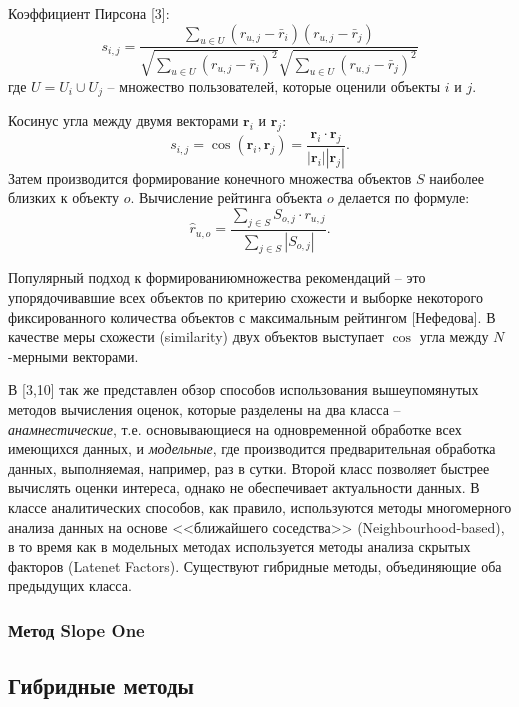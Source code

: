 \documentclass[a4paper,14pt,openany,final]{extreport} %
\begin{document}
Коэффициент Пирсона [3]:
\[
  s_{i,j}=\frac{\sum\limits_{u\in U}(r_{u,j}-\bar{r}_i)(r_{u,j}-\bar{r}_j)}{\sqrt{\sum\limits_{u\in U}(r_{u,j}-\bar{r}_i)^2}\sqrt{\sum\limits_{u\in U}(r_{u,j}-\bar{r}_j)^2}}
\]
где $U=U_i\cup U_j$ -- множество пользователей, которые оценили объекты $i$ и $j$.

Косинус угла между двумя векторами $\mathbf{r}_i$ и $\mathbf{r}_j$:
\[
  s_{i,j}=\cos(\mathbf{r}_i,\mathbf{r}_j)=\frac{\mathbf{r}_i \cdot \mathbf{r}_j}{|\mathbf{r}_i||\mathbf{r}_j|}.
\]
Затем производится формирование конечного множества объектов $S$ наиболее близких к объекту $o$. Вычисление рейтинга объекта $o$ делается по формуле:
\[
  \hat{r}_{u,o}=\frac{\sum\limits_{j\in S}S_{o,j}\cdot r_{u,j}}{\sum\limits_{j\in S}|S_{o,j}|}.
\]

Популярный подход к формированиюмножества рекомендаций -- это упорядочивавшие всех объектов по критерию схожести и выборке некоторого фиксированного количества объектов с максимальным рейтингом [Нефедова]. В качестве меры схожести (\foreignlanguage{english}{similarity}) двух объектов выступает $\cos$ угла между $N$-мерными векторами.

В [3,10] так же представлен обзор способов использования вышеупомянутых методов вычисления оценок, которые разделены на два класса -- \emph{анамнестические}, т.е. основывающиеся на одновременной обработке всех имеющихся данных, и \emph{модельные}, где производится предварительная обработка данных, выполняемая, например, раз в сутки. Второй класс позволяет быстрее вычислять оценки интереса, однако не обеспечивает актуальности данных. В классе аналитических способов, как правило, используются методы многомерного анализа данных на основе <<ближайшего соседства>> (\foreignlanguage{english}{Neighbourhood-based}), в то время как в модельных методах используется методы анализа скрытых факторов (\foreignlanguage{english}{Latenet Factors}). Существуют гибридные методы, объединяющие оба предыдущих класса.

\subsubsection{Метод Slope One}


\subsection{Гибридные методы}
\label{sec:hybrids}
\end{document}
